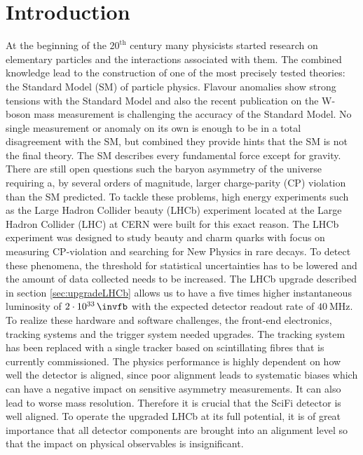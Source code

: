 \chapter{Introduction}
\label{sec:einleitung}

At the beginning of the $20^{\text{th}}$ century many physicists started research on
elementary particles and the interactions associated with them. The combined
knowledge lead to the construction of one of the most precisely tested theories: the Standard Model (SM) of particle physics.
Flavour anomalies show strong tensions with the Standard Model and also the recent publication on the W-boson mass measurement is challenging the accuracy of the Standard Model\cite{wmass}.
No single measurement or anomaly on its own is enough to be in a total disagreement with the SM, but combined they provide hints that the SM is not the final theory.
The SM describes every fundamental force except for gravity. There are still open questions such the baryon asymmetry of the universe requiring a, by several orders of magnitude, larger charge-parity (CP) violation than the SM predicted.
To tackle these problems, high energy experiments such as the Large Hadron Collider beauty (LHCb) experiment located at the Large Hadron Collider (LHC) at CERN were built for this exact reason.
The LHCb experiment was designed to study beauty and charm quarks with focus on measuring CP-violation and searching for New Physics in rare decays.
To detect these phenomena, the threshold for statistical uncertainties has to
be lowered and the amount of data collected needs to be increased. The LHCb upgrade described in section \ref{sec:upgradeLHCb} allows us to have a five times higher instantaneous luminosity of $\SI{2e33}{\invfb}$ with the expected detector readout rate of $\SI{40}{\mega\hertz}$.
To realize these hardware and software challenges, the front-end electronics, tracking systems and the trigger system needed upgrades.
The tracking system has been replaced with a single tracker based on scintillating fibres that is currently commissioned. The physics performance is highly dependent on how well the detector is aligned, since poor alignment leads to systematic biases which can have a negative impact on sensitive asymmetry measurements. It can also lead to worse mass resolution. Therefore it is crucial that the SciFi detector is well aligned.
To operate the upgraded LHCb at its full potential, it is of great importance that all detector components are brought into an alignment level so that the impact on physical observables is insignificant.
\\
